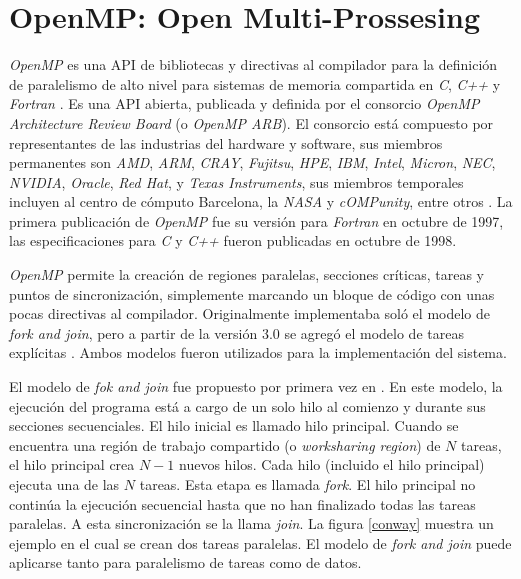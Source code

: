 
\section{OpenMP: Open Multi-Prossesing}

\label{mt_openmp}

\emph{OpenMP} es una API de bibliotecas y directivas al compilador para la
definición de paralelismo de alto nivel para sistemas de memoria compartida en
\emph{C}, \emph{C++} y \emph{Fortran} \cite{ompWeb}. Es una API abierta,
publicada y definida por el consorcio \emph{OpenMP Architecture Review Board}
(o \emph{OpenMP ARB}). El consorcio está compuesto por representantes de las
industrias del hardware y software, sus miembros permanentes son \emph{AMD},
\emph{ARM}, \emph{CRAY}, \emph{Fujitsu}, \emph{HPE}, \emph{IBM}, \emph{Intel},
\emph{Micron}, \emph{NEC}, \emph{NVIDIA}, \emph{Oracle}, \emph{Red Hat}, y
\emph{Texas Instruments}, sus miembros temporales incluyen al centro de
cómputo Barcelona, la \emph{NASA} y \emph{cOMPunity}, entre otros
\cite{ompWeb}. La primera publicación de \emph{OpenMP} fue su versión para
\emph{Fortran} en octubre de 1997, las especificaciones para \emph{C} y
\emph{C++} fueron publicadas en octubre de 1998.

\emph{OpenMP} permite la creación de regiones paralelas, secciones críticas,
tareas y puntos de sincronización, simplemente marcando un bloque de código
con unas pocas directivas al compilador. Originalmente implementaba soló el
modelo de \emph{fork and join}, pero a partir de la versión 3.0 se agregó el
modelo de tareas explícitas \cite{openmp08}. Ambos modelos fueron utilizados
para la implementación del sistema.

El modelo de \emph{fok and join} fue propuesto por primera vez en
\cite{conway1963}. En este modelo, la ejecución del programa está a cargo de un
solo hilo al comienzo y durante sus secciones secuenciales. El hilo inicial es
llamado hilo principal. Cuando se encuentra una región de trabajo compartido (o
\emph{worksharing region}) de $N$ tareas, el hilo principal crea $N-1$ nuevos
hilos. Cada hilo (incluido el hilo principal) ejecuta una de las $N$ tareas.
Esta etapa es llamada \emph{fork}. El hilo principal no continúa la ejecución
secuencial hasta que no han finalizado todas las tareas paralelas. A esta
sincronización se la llama \emph{join}. La figura \ref{conway} muestra un
ejemplo en el cual se crean dos tareas paralelas. El modelo de \emph{fork and
join} puede aplicarse tanto para paralelismo de tareas como de datos.

